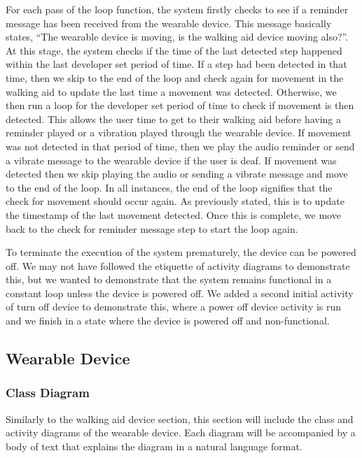                 For each pass of the loop function, the system firstly checks to see if a reminder message has been received from the wearable device. This message basically states, ``The wearable device is moving, is the walking aid device moving also?''. At this stage, the system checks if the time of the last detected step happened within the last developer set period of time. If a step had been detected in that time, then we skip to the end of the loop and check again for movement in the walking aid to update the last time a movement was detected. Otherwise, we then run a loop for the developer set period of time to check if movement is then detected. This allows the user time to get to their walking aid before having a reminder played or a vibration played through the wearable device. If movement was not detected in that period of time, then we play the audio reminder or send a vibrate message to the wearable device if the user is deaf. If movement was detected then we skip playing the audio or sending a vibrate message and move to the end of the loop. In all instances, the end of the loop signifies that the check for movement should occur again. As previously stated, this is to update the timestamp of the last movement detected. Once this is complete, we move back to the check for reminder message step to start the loop again.

                To terminate the execution of the system prematurely, the device can be powered off. We may not have followed the etiquette of activity diagrams to demonstrate this, but we wanted to demonstrate that the system remains functional in a constant loop unless the device is powered off. We added a second initial activity of turn off device to demonstrate this, where a power off device activity is run and we finish in a state where the device is powered off and non-functional.

        \subsection{Wearable Device}
        \label{subsec:wearable_device_uml}

            \subsubsection{Class Diagram}
            \label{subsubsec:class_diagram_wearable}

                Similarly to the walking aid device section, this section will include the class and activity diagrams of the wearable device. Each diagram will be accompanied by a body of text that explains the diagram in a natural language format.

